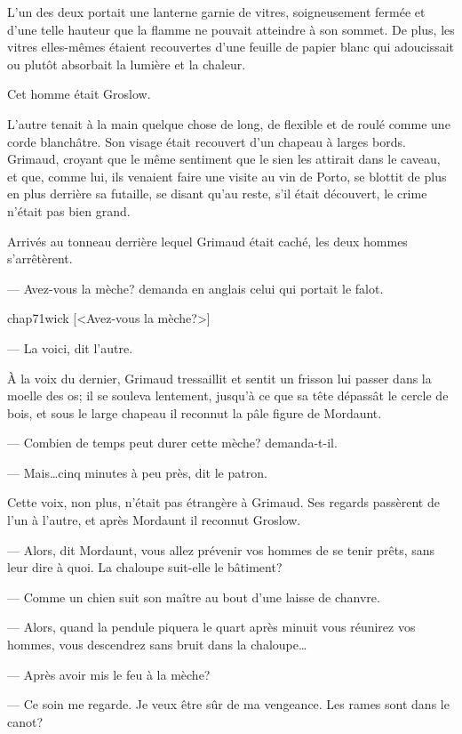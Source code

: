 L'un des deux portait une lanterne garnie de vitres, soigneusement fermée et d'une telle hauteur que la flamme ne pouvait atteindre à son sommet. De plus, les vitres elles-mêmes étaient recouvertes d'une feuille de papier blanc qui adoucissait ou plutôt absorbait la lumière et la chaleur.

Cet homme était Groslow.

L'autre tenait à la main quelque chose de long, de flexible et de roulé comme une corde blanchâtre. Son visage était recouvert d'un chapeau à larges bords. Grimaud, croyant que le même sentiment que le sien les attirait dans le caveau, et que, comme lui, ils venaient faire une visite au vin de Porto, se blottit de plus en plus derrière sa futaille, se disant qu'au reste, s'il était découvert, le crime n'était pas bien grand.

Arrivés au tonneau derrière lequel Grimaud était caché, les deux hommes s'arrêtèrent.

— Avez-vous la mèche? demanda en anglais celui qui portait le falot.

\begin{bwbigpic}
	[\basicscale] 
	{chap71wick}
	[<Avez-vous la mèche?>]
\end{bwbigpic}

— La voici, dit l'autre.

À la voix du dernier, Grimaud tressaillit et sentit un frisson lui passer dans la moelle des os; il se souleva lentement, jusqu'à ce que sa tête dépassât le cercle de bois, et sous le large chapeau il reconnut la pâle figure de Mordaunt.

— Combien de temps peut durer cette mèche? demanda-t-il.

— Mais\dots cinq minutes à peu près, dit le patron.

Cette voix, non plus, n'était pas étrangère à Grimaud. Ses regards passèrent de l'un à l'autre, et après Mordaunt il reconnut Groslow.

— Alors, dit Mordaunt, vous allez prévenir vos hommes de se tenir prêts, sans leur dire à quoi. La chaloupe suit-elle le bâtiment?

— Comme un chien suit son maître au bout d'une laisse de chanvre.

— Alors, quand la pendule piquera le quart après minuit vous réunirez vos hommes, vous descendrez sans bruit dans la chaloupe\dots

— Après avoir mis le feu à la mèche?

— Ce soin me regarde. Je veux être sûr de ma vengeance. Les rames sont dans le canot?

